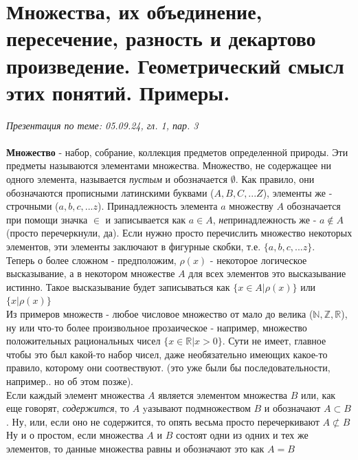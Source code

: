 \documentclass[10pt, a4paper,twocolumn]{article}
\begin{document}
\section{Множества, их объединение, пересечение, разность и декартово произведение. Геометрический смысл этих понятий. Примеры.}
\textsl{Презентация по теме: 05.09.24, гл. 1, пар. 3}
\\ \\
\textbf{Множество} - набор, собрание, коллекция предметов определенной природы. Эти предметы называются элементами множества. Множество, не содержащее ни одного элемента, называется \textsl{пустым} и обозначается $\emptyset$. Как правило, они обозначаются прописными латинскими буквами ($A, B, C, ... Z$), элементы же - строчными ($a, b, c, ... z$). Принадлежность элемента $a$ множеству $A$ обозначается при помощи значка $\in$ и записывается как $a \in A$, \textsl{не}принадлежность же - $a \notin A$ (просто перечеркнули, да).  Если нужно просто перечислить множество некоторых элементов, эти элементы заключают в фигурные скобки, т.е. $\{ a, b, c, ... z \}$. \\ Теперь о более сложном - предположим, $\rho (x) $ - некоторое логическое высказывание, а в некотором множестве $A$ для всех элементов это высказывание истинно. Такое высказывание будет записываться как $\{ x \in A | \rho (x)\}$  или $\{ x | \rho (x)  \}$ \\ Из примеров множеств - любое числовое множество от мало до велика ($\mathbb{N, Z, R}$), ну или что-то более произвольное прозаическое - например, множество положительных рациональных чисел $\{x \in \mathbb{R} | x > 0\}$. Сути не имеет, главное чтобы это был какой-то набор чисел, даже необязательно имеющих какое-то правило, которому они соотвествуют. (это уже были бы последовательности, например.. но об этом позже).
\\Если каждый элемент множества $A$ является элементом множества $B$ или, как еще говорят, \textsl{содержится}, то $A$ yазывают подмножеством $B$ и обозначают $A \subset B$. Ну, или, если оно не содержится, то опять весьма просто перечеркивают $A \not \subset B$ 
\\Ну и о простом, если множества $A$ и $B$ состоят одни из одних и тех же элементов, то данные множества равны и обозначают это как $A = B$
\end{document}
